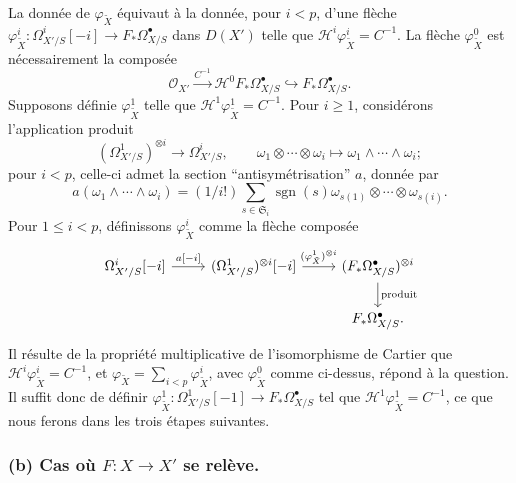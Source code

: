 \documentclass[12pt,a4paper]{article}
\theoremstyle{plain}
\theoremstyle{definition}
\theoremstyle{remark}
\DeclareMathOperator{\sgn}{sgn}
\newcommand{\cO}{\mathcal{O}}
\begin{document}
La donn\'ee de $\varphi_{\tilde{X}}$ \'equivaut \`a la donn\'ee, pour $i < p$, d'une fl\`eche $\varphi^i_{\tilde{X}}: \Omega^i_{X'/S}[-i] \to F_* \Omega^{\bullet}_{X/S}$ dans $D(X')$ telle que $\mathscr{H}^i \varphi^i_{\tilde{X}} = C^{-1}$. La fl\`eche $\varphi^0_{\tilde{X}}$ est n\'ecessairement la compos\'ee
\[
\cO_{X'} \xrightarrow{C^{-1}} \mathscr{H}^0 F_* \Omega^{\bullet}_{X/S} \hookrightarrow F_* \Omega^{\bullet}_{X/S}.
\]
Supposons d\'efinie $\varphi^1_{\tilde{X}}$ telle que $\mathscr{H}^1 \varphi^1_{\tilde{X}} = C^{-1}$. Pour $i \ge 1$, consid\'erons l'application produit
\[
(\Omega^1_{X'/S})^{\otimes i} \to \Omega^i_{X'/S}, \qquad \omega_1 \otimes \cdots \otimes \omega_i \mapsto \omega_1 \wedge \cdots \wedge \omega_i;
\]
pour $i < p$, celle-ci admet la section ``antisym\'etrisation'' $a$, donn\'ee par
\[
a(\omega_1 \wedge \cdots \wedge \omega_i) = (1/i!) \sum_{s \in \mathfrak{S}_i} \sgn(s) \omega_{s(1)} \otimes \cdots \otimes \omega_{s(i)}.
\]
Pour $1 \le i < p$, d\'efinissons $\varphi^i_{\tilde{X}}$ comme la fl\`eche compos\'ee
\[
\begin{tikzcd}
\Omega^i_{X'/S}[-i] \arrow[r, "{a[-i]}"] & (\Omega^1_{X'/S})^{\otimes i}[-i] \arrow[r, "{(\varphi^1_{\tilde{X}})^{\otimes i}}"] & (F_* \Omega^{\bullet}_{X/S})^{\otimes i} \arrow[d, "\text{produit}"] \\
& & F_* \Omega^{\bullet}_{X/S}.
\end{tikzcd}
\]
Il r\'esulte de la propri\'et\'e multiplicative de l'isomorphisme de Cartier que $\mathscr{H}^i \varphi^i_{\tilde{X}} = C^{-1}$, et $\varphi_{\tilde{X}} = \sum_{i < p} \varphi^i_{\tilde{X}}$, avec $\varphi^0_{\tilde{X}}$ comme ci-dessus, r\'epond \`a la question. Il suffit donc de d\'efinir $\varphi^1_{\tilde{X}}: \Omega^1_{X'/S}[-1] \to F_* \Omega^{\bullet}_{X/S}$ tel que $\mathscr{H}^1 \varphi^1_{\tilde{X}} = C^{-1}$, ce que nous ferons dans les trois \'etapes suivantes.

\subsubsection*{(b) Cas o\`u $F: X \to X'$ se rel\`eve.}
\end{document}
